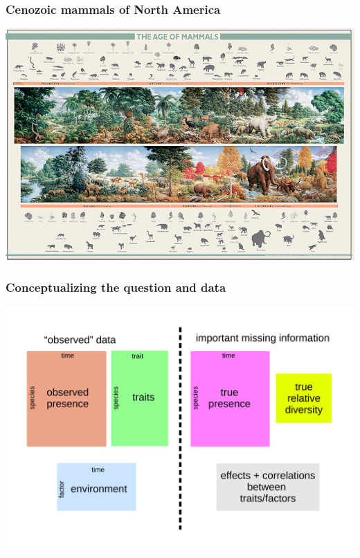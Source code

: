 \documentclass{beamer}
\begin{document}
\begin{frame}
  \frametitle{Cenozoic mammals of North America}
  \begin{center}
    \includegraphics[height=0.8\textheight,width=\textwidth,keepaspectratio=true]{figure/aom}
  \end{center}
\end{frame}

%
%

\begin{frame}
  \frametitle{Conceptualizing the question and data}
  \begin{center}
    \includegraphics[width=\textwidth,height=\textheight,keepaspectratio=true]{figure/problem_concept}
  \end{center}
\end{frame}
\end{document}
